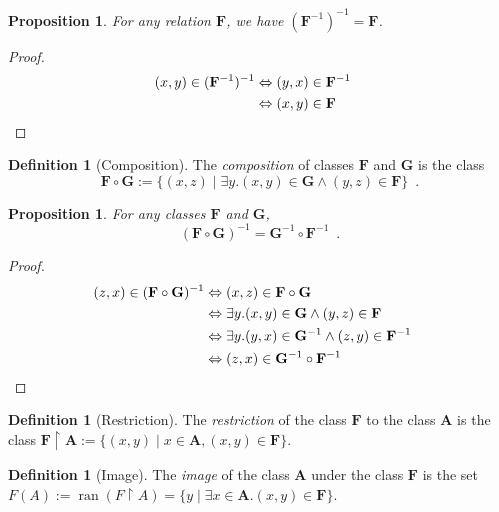 \documentclass{book}
\let\qed\relax
\newtheorem{prop}[ax]{Proposition}
\theoremstyle{definition}
\newtheorem{df}[ax]{Definition}
\newcommand{\ran}{\ensuremath{\operatorname{ran}}}
\begin{document}
\begin{prop}
For any relation $\mathbf{F}$, we have $(\mathbf{F}^{-1})^{-1} = \mathbf{F}$.
\end{prop}

\begin{proof}
\pf
\begin{align*}
(x,y) \in (\mathbf{F}^{-1})^{-1} & \Leftrightarrow (y,x) \in \mathbf{F}^{-1} \\
& \Leftrightarrow (x,y) \in \mathbf{F} & \qed
\end{align*}
\end{proof}

\begin{df}[Composition]
The \emph{composition} of classes $\mathbf{F}$ and $\mathbf{G}$ is the class
\[ \mathbf{F} \circ \mathbf{G} := \{ (x,z) \mid \exists y. (x,y) \in \mathbf{G} \wedge (y,z) \in \mathbf{F} \} \enspace . \]
\end{df}

\begin{prop}
For any classes $\mathbf{F}$ and $\mathbf{G}$,
\[ (\mathbf{F} \circ \mathbf{G})^{-1} = \mathbf{G}^{-1} \circ \mathbf{F}^{-1} \enspace . \]
\end{prop}

\begin{proof}
\pf
\begin{align*}
(z,x) \in (\mathbf{F} \circ \mathbf{G})^{-1} & \Leftrightarrow (x,z) \in \mathbf{F} \circ \mathbf{G} \\
& \Leftrightarrow \exists y. (x,y) \in \mathbf{G} \wedge (y,z) \in \mathbf{F} \\
& \Leftrightarrow \exists y. (y,x) \in \mathbf{G}^{-1} \wedge (z,y) \in \mathbf{F}^{-1} \\
& \Leftrightarrow (z,x) \in \mathbf{G}^{-1} \circ \mathbf{F}^{-1} & \qed
\end{align*}
\end{proof}

\begin{df}[Restriction]
The \emph{restriction} of the class $\mathbf{F}$ to the class $\mathbf{A}$ is the class $\mathbf{F} \restriction \mathbf{A} := \{ (x,y) \mid x \in \mathbf{A}, (x,y) \in \mathbf{F} \}$.
\end{df}

\begin{df}[Image]
The \emph{image} of the class $\mathbf{A}$ under the class $\mathbf{F}$ is the set $F(A) := \ran (F \restriction A) = \{ y \mid \exists x \in \mathbf{A}. (x,y) \in \mathbf{F} \}$.
\end{df}
\end{document}
